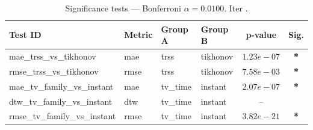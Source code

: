 ﻿%
\begin{table}[ht]
\centering
\caption[EEG reconstruction - Iteration it33]{Significance tests — Bonferroni $\alpha=0.0100$. Iter .}
\label{tab:sig_it33_3syn_mr30_only}
\small
\begin{tabular}{llllcc}
\toprule
Test ID & Metric & Group A & Group B & p-value & Sig. \\
\midrule
mae\_trss\_vs\_tikhonov & mae & trss & tikhonov & $1.23e-07$ & \textbf{*} \\
rmse\_trss\_vs\_tikhonov & rmse & trss & tikhonov & $7.58e-03$ & \textbf{*} \\
mae\_tv\_family\_vs\_instant & mae & tv\_time & instant & $2.07e-07$ & \textbf{*} \\
dtw\_tv\_family\_vs\_instant & dtw & tv\_time & instant & -- &  \\
rmse\_tv\_family\_vs\_instant & rmse & tv\_time & instant & $3.82e-21$ & \textbf{*} \\
\bottomrule
\end{tabular}
\end{table}







